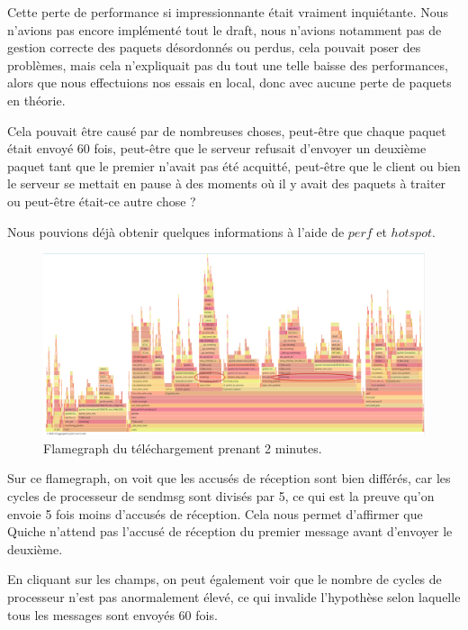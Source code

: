 Cette perte de performance si impressionnante était vraiment inquiétante. Nous n'avions pas encore implémenté tout le draft, nous n'avions notamment pas de gestion correcte des paquets désordonnés ou perdus, cela pouvait poser des problèmes, mais cela n'expliquait pas du tout une telle baisse des performances, alors que nous effectuions nos essais en local, donc avec aucune perte de paquets en théorie.

\vspace{0.5cm}

Cela pouvait être causé par de nombreuses choses, peut-être que chaque paquet était envoyé 60 fois, peut-être que le serveur refusait d'envoyer un deuxième paquet tant que le premier n'avait pas été acquitté, peut-être que le client ou bien le serveur se mettait en pause à des moments où il y avait des paquets à traiter ou peut-être était-ce autre chose ?

\vspace{0.5cm}

Nous pouvions déjà obtenir quelques informations à l'aide de $perf$ et $hotspot$.

\begin{figure}[H]
    \centering
    \includegraphics[width=\textwidth]{figures/flamegraph_delayed_ack.png}
    \caption{Flamegraph du téléchargement prenant 2 minutes.}
\end{figure}

Sur ce flamegraph, on voit que les accusés de réception sont bien différés, car les cycles de processeur de sendmsg sont divisés par 5, ce qui est la preuve qu'on envoie 5 fois moins d'accusés de réception.
Cela nous permet d'affirmer que Quiche n'attend pas l'accusé de réception du premier message avant d'envoyer le deuxième.

En cliquant sur les champs, on peut également voir que le nombre de cycles de processeur n'est pas anormalement élevé, ce qui invalide l'hypothèse selon laquelle tous les messages sont envoyés 60 fois.

